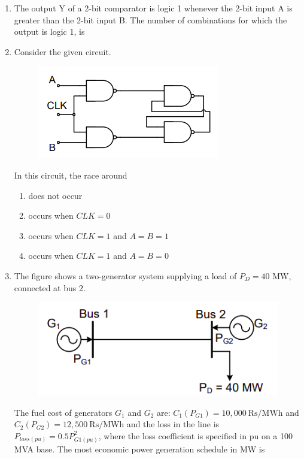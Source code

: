 \documentclass[journal,12pt,onecolumn]{IEEEtran}
\theoremstyle{remark}
\begin{document}
\begin{enumerate}[start=1, label=Q.\arabic*]
\item The output Y of a 2-bit comparator is logic 1 whenever the 2-bit input A is greater than the 2-bit input B. The number of combinations for which the output is logic 1, is

\begin{enumerate}
\end{enumerate}
\hfill{}

\item Consider the given circuit.
\begin{figure}[H]
    \centering
    \includegraphics[width=0.4\columnwidth]{Figures/q20.png}
    \caption{}
\end{figure}
In this circuit, the race around

\begin{enumerate}
    \item does not occur
    \item occurs when $CLK=0$
    \item occurs when $CLK=1$ and $A=B=1$
    \item occurs when $CLK=1$ and $A=B=0$
\end{enumerate}
\hfill{}

\item The figure shows a two-generator system supplying a load of $P_{D}=40$ MW, connected at bus 2.
\begin{figure}[H]
    \centering
    \includegraphics[width=0.5\columnwidth]{Figures/q21.png}
    \caption{}
\end{figure}
The fuel cost of generators $G_{1}$ and $G_{2}$ are: $C_{1}(P_{G1})=10,000~\text{Rs/MWh}$ and $C_{2}(P_{G2})=12,500~\text{Rs/MWh}$ and the loss in the line is $P_{loss(pu)}=0.5P_{G1(pu)}^{2}$, where the loss coefficient is specified in pu on a 100 MVA base. The most economic power generation schedule in MW is


\end{enumerate}
\end{document}
